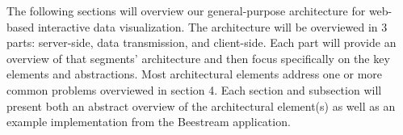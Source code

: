 %
%

The following sections will overview our general-purpose architecture for web-based interactive data visualization.  The architecture will be overviewed in 3 parts: server-side, data transmission, and client-side.  Each part will provide an overview of that segments’ architecture and then focus specifically on the key elements and abstractions.  Most architectural elements address one or more common problems overviewed in section 4. Each section and subsection will present both an abstract overview of the architectural element(s) as well as an example implementation from the Beestream application. \par
